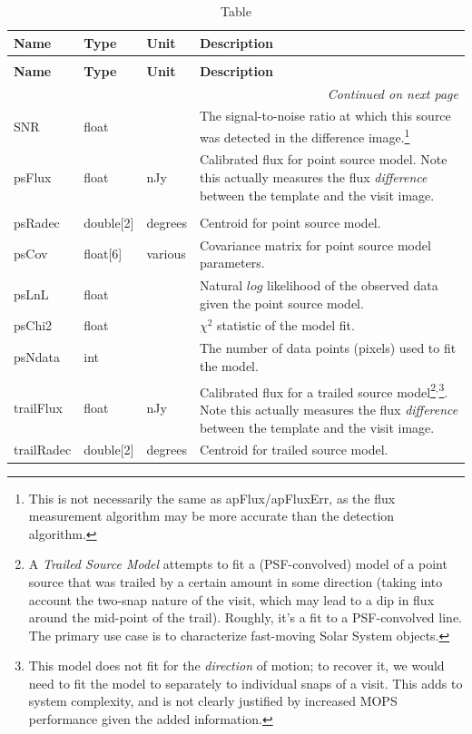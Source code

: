 \documentclass[SE,lsstdraft,toc]{lsstdoc}
\newenvironment{schema}[3]{%
\setlength\LTleft{0pt}
\setlength\LTright{\fill}
\begin{longtable}{p{0.2\textwidth}p{0.14\textwidth}p{0.14\textwidth}p{0.41\textwidth}}

\caption[#1]{#2\label{#3}}\\

\hline \textbf{Name} & \textbf{Type} & \textbf{Unit} & \textbf{Description}\\ \hline
\endfirsthead

\caption[#1]{#2}\\

\hline \textbf{Name} & \textbf{Type} & \textbf{Unit} & \textbf{Description}\\ \hline
\endhead

\hline \multicolumn{4}{r}{\emph{Continued on next page}} \\
\endfoot

\hline\hline
\endlastfoot
}{%
\hline
\end{longtable}
}
\begin{document}
\begin{schema}{\DIASource Table}{\DIASource Table}{tbl:diasourceTable}
SNR & float & ~ & The signal-to-noise ratio at which this source was detected in the difference image.\footnote{This is not necessarily the same as apFlux/apFluxErr, as the flux measurement algorithm may be more accurate than the detection algorithm.} \\

psFlux & float & nJy & Calibrated flux for point source model. Note this actually measures the flux \emph{difference} between the template and the visit image. \\

\newtext{psFluxErr} & \newtext{float} & \newtext{nJy} & \newtext{Estimated uncertainty of \texttt{psFlux}.} \\

psRadec & double[2] & degrees & Centroid for point source model. \\

psCov & float[6] & various & Covariance matrix for point source model parameters. \\

psLnL & float & ~ & Natural $log$ likelihood of the observed data given the point source model. \\

psChi2 & float & ~ & $\chi^2$ statistic of the model fit. \\

psNdata & int & ~ & The number of data points (pixels) used to fit the model. \\

trailFlux & float & nJy & Calibrated flux for a trailed source model\footnote{A \emph{Trailed Source Model} attempts to fit a (PSF-convolved) model of a point source that was trailed by a certain amount in some direction (taking into account the two-snap nature of the visit, which may lead to a dip in flux around the mid-point of the trail). Roughly, it's a fit to a PSF-convolved line. The primary use case is to characterize fast-moving Solar System objects.}$^,$\footnote{This model does not fit for the \emph{direction} of motion; to recover it, we would need to fit the model to separately to individual snaps of a visit. This adds to system complexity, and is not clearly justified by increased MOPS performance given the added information.}. Note this actually measures the flux \emph{difference} between the template and the visit image. \\

trailRadec & double[2] & degrees & Centroid for trailed source model. \\


\end{schema}
\end{document}
